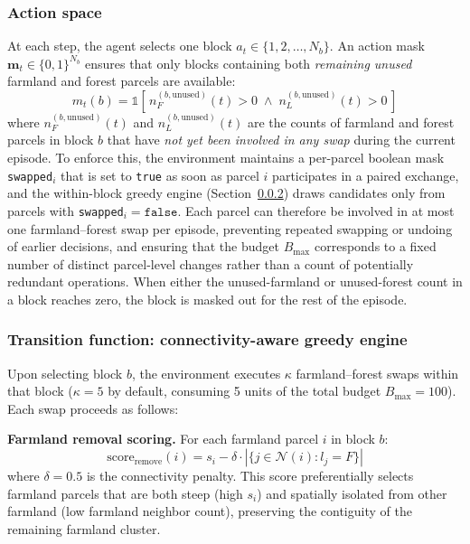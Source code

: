 \documentclass[preprint,12pt]{elsarticle}
\begin{document}
\subsubsection{Action space}

At each step, the agent selects one block $a_t \in \{1, 2, \ldots, N_b\}$. An action mask $\mathbf{m}_t \in \{0, 1\}^{N_b}$ ensures that only blocks containing both \textit{remaining unused} farmland and forest parcels are available:
\begin{equation}
m_t(b) = \mathbb{1}\!\left[\,n_F^{(b,\text{unused})}(t) > 0 \;\wedge\; n_L^{(b,\text{unused})}(t) > 0\,\right]
\end{equation}
where $n_F^{(b,\text{unused})}(t)$ and $n_L^{(b,\text{unused})}(t)$ are the counts of farmland and forest parcels in block $b$ that have \textit{not yet been involved in any swap} during the current episode. To enforce this, the environment maintains a per-parcel boolean mask \texttt{swapped}$_i$ that is set to \texttt{true} as soon as parcel $i$ participates in a paired exchange, and the within-block greedy engine (Section~\ref{sec:greedy_engine}) draws candidates only from parcels with \texttt{swapped}$_i = \texttt{false}$. Each parcel can therefore be involved in at most one farmland--forest swap per episode, preventing repeated swapping or undoing of earlier decisions, and ensuring that the budget $B_{\max}$ corresponds to a fixed number of distinct parcel-level changes rather than a count of potentially redundant operations. When either the unused-farmland or unused-forest count in a block reaches zero, the block is masked out for the rest of the episode.

\subsubsection{Transition function: connectivity-aware greedy engine}
\label{sec:greedy_engine}

Upon selecting block $b$, the environment executes $\kappa$ farmland--forest swaps within that block ($\kappa = 5$ by default, consuming 5 units of the total budget $B_{\max} = 100$). Each swap proceeds as follows:

\textbf{Farmland removal scoring.} For each farmland parcel $i$ in block $b$:
\begin{equation}
\text{score}_{\text{remove}}(i) = s_i - \delta \cdot |\{j \in \mathcal{N}(i) : l_j = F\}|
\label{eq:score_remove}
\end{equation}
where $\delta = 0.5$ is the connectivity penalty. This score preferentially selects farmland parcels that are both steep (high $s_i$) and spatially isolated from other farmland (low farmland neighbor count), preserving the contiguity of the remaining farmland cluster.
\end{document}
